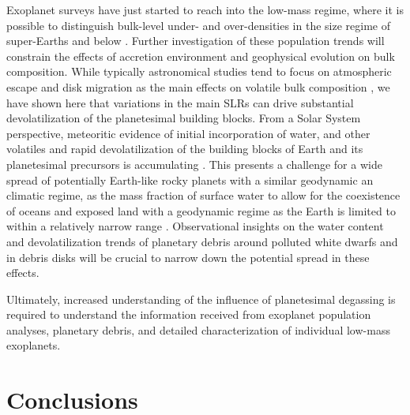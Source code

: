 \documentclass[fleqn,usenatbib]{mnras}
\begin{document}
Exoplanet surveys have just started to reach into the low-mass regime, where it is possible to distinguish bulk-level under- and over-densities in the size regime of super-Earths and below \citep{Wordsworth2022,2023arXiv230610100P}. Further investigation of these population trends will constrain the effects of accretion environment and geophysical evolution on bulk composition. While typically astronomical studies tend to focus on atmospheric escape and disk migration as the main effects on volatile bulk composition \citep{2020SSRv..216...86V,2021JGRE..12606639B}, we have shown here that variations in the main SLRs can drive substantial devolatilization of the planetesimal building blocks. From a Solar System perspective, meteoritic evidence of initial incorporation of water, and other volatiles and rapid devolatilization of the building blocks of Earth and its planetesimal precursors is accumulating \citep{2017RSPTA.37560209S,2019E&PSL.52615771M,2021Sci...371..365L,2021PNAS..11826779H,2021NatAs...5..356G,2023GeCoA.340..141P,2022GeCoA.316..201L,2023Natur.615..854N,2023E&PSL.61518202S,grant2023bulk}.
This presents a challenge for a wide spread of potentially Earth-like rocky planets with a similar geodynamic an climatic regime, as the mass fraction of surface water to allow for the coexistence of oceans and exposed land with a geodynamic regime as the Earth is limited to within a relatively narrow range \citep{2014ApJ...781...27C,2015ApJ...801...40S,2017SSRv..212..877N}. Observational insights on the water content and devolatilization trends of planetary debris around polluted white dwarfs \citep{2013Sci...342..218F,2022MNRAS.515..395C} and in debris disks \citep{2021ApJ...913L..20L,2022arXiv220203053M,2023arXiv230701574B} will be crucial to narrow down the potential spread in these effects. 

Ultimately, increased understanding of the influence of planetesimal degassing is required to understand the information received from exoplanet population analyses, planetary debris, and detailed characterization of individual low-mass exoplanets.

\section{Conclusions}
\label{sec:conclusion}
\end{document}
